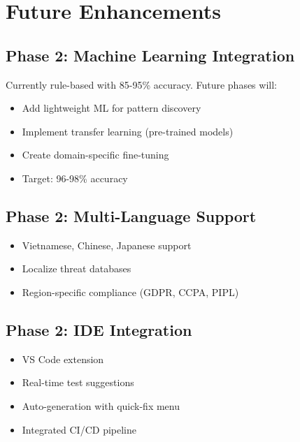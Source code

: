 \documentclass[12pt,oneside]{report}
\begin{document}

\chapter{Future Enhancements}

\section{Phase 2: Machine Learning Integration}

Currently rule-based with 85-95\% accuracy. Future phases will:

\begin{itemize}
    \item Add lightweight ML for pattern discovery
    \item Implement transfer learning (pre-trained models)
    \item Create domain-specific fine-tuning
    \item Target: 96-98\% accuracy
\end{itemize}

\section{Phase 2: Multi-Language Support}

\begin{itemize}
    \item Vietnamese, Chinese, Japanese support
    \item Localize threat databases
    \item Region-specific compliance (GDPR, CCPA, PIPL)
\end{itemize}

\section{Phase 2: IDE Integration}

\begin{itemize}
    \item VS Code extension
    \item Real-time test suggestions
    \item Auto-generation with quick-fix menu
    \item Integrated CI/CD pipeline
\end{itemize}
\end{document}
